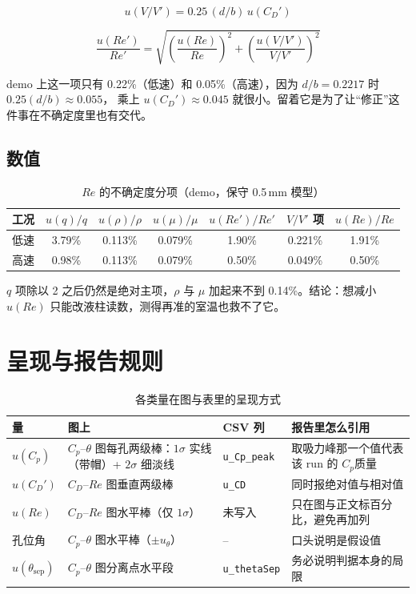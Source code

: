 \documentclass[11pt,a4paper]{ctexart}
\newcommand{\Cp}{\ensuremath{C_p}}
\newcommand{\CD}{\ensuremath{C_D}}
\newcommand{\ReD}{\ensuremath{\mathit{Re}}}
\begin{document}
\begin{equation}
u(V/V') = 0.25\,(d/b)\,u(\CD')
\end{equation}

\begin{equation}
\frac{u(\ReD')}{\ReD'} = \sqrt{\left(\frac{u(\ReD)}{\ReD}\right)^2
+ \left(\frac{u(V/V')}{V/V'}\right)^2}
\end{equation}

demo 上这一项只有 0.22\%（低速）和 0.05\%（高速），因为 $d/b = 0.2217$ 时 $0.25(d/b) \approx 0.055$，
乘上 $u(\CD') \approx 0.045$ 就很小。留着它是为了让“修正”这件事在不确定度里也有交代。

\subsection{数值}

\begin{table}[H]
\centering
\caption{\ReD{} 的不确定度分项（demo，保守 0.5\,mm 模型）}
\small
\begin{tabular}{@{}l c c c c c c@{}}
\toprule
工况 & $u(q)/q$ & $u(\rho)/\rho$ & $u(\mu)/\mu$ & $u(\ReD')/\ReD'$ & $V/V'$ 项 & $u(\ReD)/\ReD$ \\
\midrule
低速 & 3.79\% & 0.113\% & 0.079\% & 1.90\% & 0.221\% & 1.91\% \\
高速 & 0.98\% & 0.113\% & 0.079\% & 0.50\% & 0.049\% & 0.50\% \\
\bottomrule
\end{tabular}
\end{table}

$q$ 项除以 2 之后仍然是绝对主项，$\rho$ 与 $\mu$ 加起来不到 0.14\%。结论：想减小 $u(\ReD)$
只能改液柱读数，测得再准的室温也救不了它。

\section{呈现与报告规则}

\begin{table}[H]
\centering
\caption{各类量在图与表里的呈现方式}
\small
\begin{tabularx}{\textwidth}{@{}l X l X@{}}
\toprule
量 & 图上 & CSV 列 & 报告里怎么引用 \\
\midrule
$u(\Cp)$ & \Cp--$\theta$ 图每孔两级棒：$1\sigma$ 实线（带帽）+ $2\sigma$ 细淡线 & \texttt{u\_Cp\_peak} & 取吸力峰那一个值代表该 run 的 \Cp 质量 \\
$u(\CD')$ & \CD--\ReD{} 图垂直两级棒 & \texttt{u\_CD} & 同时报绝对值与相对值 \\
$u(\ReD)$ & \CD--\ReD{} 图水平棒（仅 $1\sigma$） & 未写入 & 只在图与正文标百分比，避免再加列 \\
孔位角 & \Cp--$\theta$ 图水平棒（$\pm u_\theta$） & -- & 口头说明是假设值 \\
$u(\theta_{\text{sep}})$ & \Cp--$\theta$ 图分离点水平段 & \texttt{u\_thetaSep} & 务必说明判据本身的局限 \\
\bottomrule
\end{tabularx}
\end{table}
\end{document}
